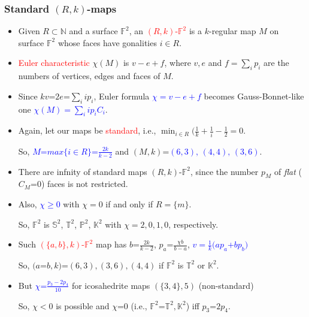 \documentclass{beamer}
\begin{document}
\begin{frame}\frametitle{Standard $(R,k)$-maps}
\vspace{-3mm}
\begin{itemize}

\item Given $R\subset \mathbb{N}$ and a surface $\mathbb{F}^2$, an
\textcolor{red}{$(R,k)$-$\mathbb{F}^2$} is
a $k$-regular map $M$ on surface $\mathbb{F}^2$
whose faces have gonalities $i\in R$.

\item
\textcolor{red}{Euler characteristic} $\chi(M)$ is $v-e+f$, where $v,e$ and
$f=\sum_{i}p_i$ are the numbers of
vertices, edges and faces of $M$.
\item Since 
$kv$=$2e$=$\sum_{i}ip_i$, 
 Euler formula
\textcolor{blue}{$\chi=v-e+f$}
  becomes Gauss-Bonnet-like one
 \textcolor{blue}{$\chi(M)=\sum_{i}ip_iC_i$}.

\item
Again, let our
maps be
\textcolor{red}{standard}, i.e.,
$\min_{i\in R}(\frac{1}{k}+\frac{1}{i}-\frac{1}{2}=0$.

So,  
\textcolor{blue}{$M$=$max\{i\in R\}$=$\frac{2k}{k-2}$} 
and $(M,k)$=\textcolor{blue}{$(6,3),\,(4,4),\,(3,6)$}.


\item There are infnity of standard maps $(R,k)$-$\mathbb{F}^2$, since the 
number
$p_M$ of {\em flat} ($C_M$=$0$) faces is not restricted.
\item 
Also, \textcolor{blue}{$\chi\ge 0$} with $\chi=0$ if and only if 
$R=\{m\}$. 

So, $\mathbb{F}^2$ is 
$\mathbb{S}^2$, $\mathbb{T}^2$, $\mathbb{P}^2$, $\mathbb{K}^2$
with  $\chi=2, 0, 1, 0$, respectively. 
 
\item Such \textcolor{red}{$(\{a,b\},k)$-$\mathbb{F}^2$}
map has $b$=$\frac{2k}{k-2}$,
 $p_a$=$\frac{\chi b}{b-a}$,
\textcolor{blue}{$v$$=$$\frac{1}{k}(ap_a$+$bp_b)$}

So, 
$(a$=$b,k)$=$(6,3),(3,6),(4,4)$ if $\mathbb{F}^2$ is $\mathbb{T}^2$ 
 or $\mathbb{K}^2$.
\item But \textcolor{blue}{$\chi$=$\frac{p_3-2p_4}{10}$} for icosahedrite 
maps $(\{3,4\},5)$ 
(non-standard)

So, $\chi$$<$$0$ is possible and 
$\chi$=$0$ (i.e., $\mathbb{F}^2$=$\mathbb{T}^2, \mathbb{K}^2$) iff
$p_3$=$2p_4$.



\end{itemize}
 
\end{frame}
 
\end{document}
